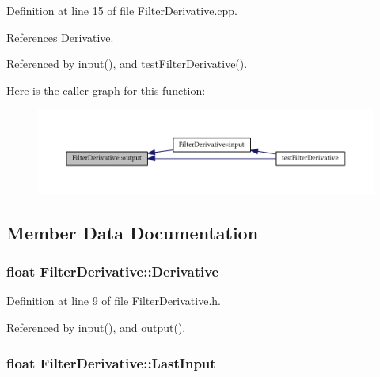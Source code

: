 Definition at line 15 of file Filter\+Derivative.\+cpp.



References Derivative.



Referenced by input(), and test\+Filter\+Derivative().



Here is the caller graph for this function\+:\nopagebreak
\begin{figure}[H]
\begin{center}
\leavevmode
\includegraphics[width=350pt]{struct_filter_derivative_a0794f9bc873d2bfaa9ee974e21b6a02d_icgraph}
\end{center}
\end{figure}




\subsection{Member Data Documentation}
\subsubsection[{\texorpdfstring{Derivative}{Derivative}}]{\setlength{\rightskip}{0pt plus 5cm}float Filter\+Derivative\+::\+Derivative}\hypertarget{struct_filter_derivative_a3cbe0628c52a5853670b0e5daaaaeace}{}\label{struct_filter_derivative_a3cbe0628c52a5853670b0e5daaaaeace}


Definition at line 9 of file Filter\+Derivative.\+h.



Referenced by input(), and output().

\subsubsection[{\texorpdfstring{Last\+Input}{LastInput}}]{\setlength{\rightskip}{0pt plus 5cm}float Filter\+Derivative\+::\+Last\+Input}\hypertarget{struct_filter_derivative_af161c7f88a440f7e3c2a7b2c33ed433a}{}\label{struct_filter_derivative_af161c7f88a440f7e3c2a7b2c33ed433a}



